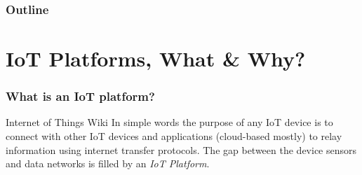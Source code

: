 \documentclass{../iot-lecture}
\subtitle{IoT Platforms}
\begin{document}
\begin{frame}
  \titlepage{}
\end{frame}
\begin{frame}
  \frametitle{Outline}
  \tableofcontents{}
\end{frame}

\section{IoT Platforms, What \& Why?}

\begin{frame}
  \frametitle{What is an IoT platform?}
  \begin{block}{Internet of Things Wiki}
    In simple words the purpose of any IoT device is to connect with
    other IoT devices and applications (cloud-based mostly) to relay
    information using internet transfer protocols.
    The gap between the device sensors and data networks is filled
    by an \textit{\color{Green} IoT Platform}.
  \end{block}
\end{frame}
\end{document}
